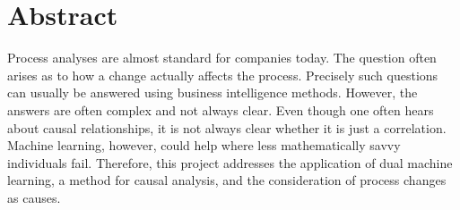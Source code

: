 \chapter*{Abstract}
Process analyses are almost standard for companies today. The question often arises as to how a change actually affects the process. Precisely such questions can usually be answered using business intelligence methods. However, the answers are often complex and not always clear. Even though one often hears about causal relationships, it is not always clear whether it is just a correlation. Machine learning, however, could help where less mathematically savvy individuals fail. Therefore, this project addresses the application of dual machine learning, a method for causal analysis, and the consideration of process changes as causes.
\clearpage

\ohead{\pagemark}

\tableofcontents

\listoffigures
{}

\listoftables
{}
\clearpage